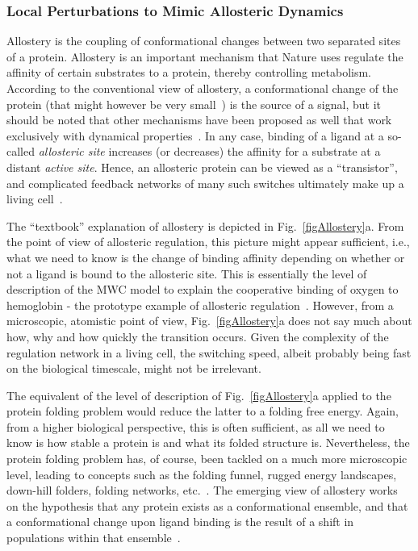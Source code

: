 \documentclass[journal=jacsat,manuscript=article]{achemso}
\begin{document}
\subsubsection{Local Perturbations to Mimic Allosteric Dynamics}
Allostery is the coupling of conformational changes between two
separated sites of a protein. Allostery is an important mechanism that
Nature uses regulate the affinity of certain substrates to a protein,
thereby controlling metabolism. According to the conventional view of
allostery, a conformational change of the protein (that might however
be very small~\cite{Nussinov15}) is the source of a signal, but it
should be noted that other mechanisms have been proposed as well that
work exclusively with dynamical properties~\cite{cooper84}. In any
case, binding of a ligand at a so-called \textit{allosteric site}
increases (or decreases) the affinity for a substrate at a distant
\textit{active site}. Hence, an allosteric protein can be viewed as a
``transistor'', and complicated feedback networks of many such
switches ultimately make up a living cell~\cite{alon07}.

The ``textbook'' explanation of allostery is depicted in
Fig.~\ref{figAllostery}a. From the point of view of allosteric
regulation, this picture might appear sufficient, i.e., what we need
to know is the change of binding affinity depending on whether or not
a ligand is bound to the allosteric site. This is essentially the
level of description of the MWC model to explain the cooperative
binding of oxygen to hemoglobin - the prototype example of allosteric
regulation~\cite{Eaton99}. However, from a microscopic, atomistic
point of view, Fig.~\ref{figAllostery}a does not say much about how,
why and how quickly the transition occurs. Given the complexity of the
regulation network in a living cell, the switching speed, albeit
probably being fast on the biological timescale, might not be
irrelevant.


The equivalent of the level of description of Fig.~\ref{figAllostery}a
applied to the protein folding problem would reduce the latter to a
folding free energy. Again, from a higher biological perspective, this
is often sufficient, as all we need to know is how stable a protein is
and what its folded structure is. Nevertheless, the protein folding
problem has, of course, been tackled on a much more microscopic level,
leading to concepts such as the folding funnel, rugged energy
landscapes, down-hill folders, folding networks, etc.~\cite{brooks98,
  dill08,kubelka04,Gruebele99,krivov04,caflisch06}. The emerging view
of allostery works on the hypothesis that any protein exists as a
conformational ensemble, and that a conformational change upon ligand
binding is the result of a shift in populations within that
ensemble~\cite{gunasekaran04, tsai14}.
\end{document}
